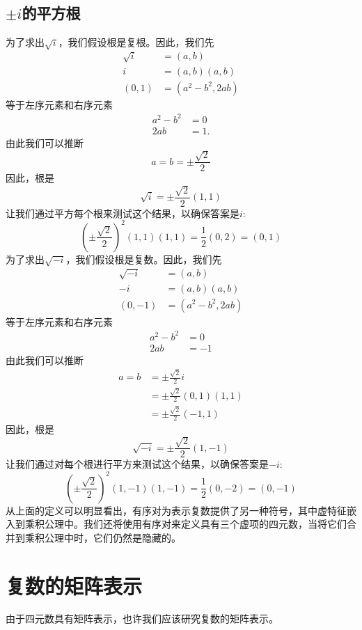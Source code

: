 \subsection{\boldmath $\pm i$的平方根}
为了求出$\sqrt{i}$，我们假设根是复根。因此，我们先
$$
\begin{aligned}
\sqrt{i} & =(a, b) \\
i & =(a, b)(a, b) \\
(0,1) & =\left(a^{2}-b^{2}, 2 a b\right)
\end{aligned}
$$
等于左序元素和右序元素
$$
\begin{aligned}
a^{2}-b^{2} & =0 \\
2 a b & =1 .
\end{aligned}
$$
由此我们可以推断
$$
a=b= \pm \frac{\sqrt{2}}{2}
$$
因此，根是
$$
\sqrt{i}= \pm \frac{\sqrt{2}}{2}(1,1)
$$
让我们通过平方每个根来测试这个结果，以确保答案是$i$:
$$
\left( \pm \frac{\sqrt{2}}{2}\right)^{2}(1,1)(1,1)=\frac{1}{2}(0,2)=(0,1)
$$
为了求出$\sqrt{-i}$，我们假设根是复数。因此，我们先
$$
\begin{aligned}
\sqrt{-i} & =(a, b) \\
-i & =(a, b)(a, b) \\
(0,-1) & =\left(a^{2}-b^{2}, 2 a b\right)
\end{aligned}
$$
等于左序元素和右序元素
$$
\begin{aligned}
a^{2}-b^{2} & =0 \\
2 a b & =-1
\end{aligned}
$$
由此我们可以推断
$$
\begin{aligned}
a=b & = \pm \frac{\sqrt{2}}{2} i \\
& = \pm \frac{\sqrt{2}}{2}(0,1)(1,1) \\
& = \pm \frac{\sqrt{2}}{2}(-1,1)
\end{aligned}
$$
因此，根是
$$
\sqrt{-i}= \pm \frac{\sqrt{2}}{2}(1,-1)
$$
让我们通过对每个根进行平方来测试这个结果，以确保答案是$-i$:
$$
\left( \pm \frac{\sqrt{2}}{2}\right)^{2}(1,-1)(1,-1)=\frac{1}{2}(0,-2)=(0,-1)
$$
从上面的定义可以明显看出，有序对为表示复数提供了另一种符号，其中虚特征嵌入到乘积公理中。我们还将使用有序对来定义具有三个虚项的四元数，当将它们合并到乘积公理中时，它们仍然是隐藏的。

\section{复数的矩阵表示}
由于四元数具有矩阵表示，也许我们应该研究复数的矩阵表示。

